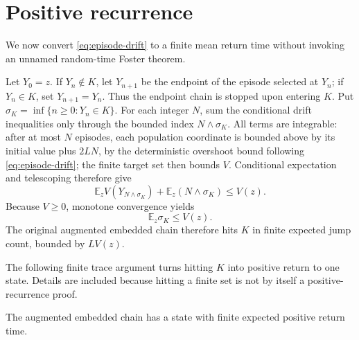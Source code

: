 \section{Positive recurrence}\label{sec:recurrence}

We now convert \eqref{eq:episode-drift} to a finite mean return time without
invoking an unnamed random-time Foster theorem.

Let \(Y_0=z\).  If \(Y_n\notin K\), let \(Y_{n+1}\) be the endpoint of the
episode selected at \(Y_n\); if \(Y_n\in K\), set \(Y_{n+1}=Y_n\).  Thus the
endpoint chain is stopped upon entering \(K\).  Put
\(
 \sigma_K=\inf\{n\ge0:Y_n\in K\}.
\)
For each integer \(N\), sum the conditional drift inequalities only through
the bounded index \(N\wedge\sigma_K\).  All terms are integrable: after at
most \(N\) episodes, each population coordinate is bounded above by its
initial value plus \(2LN\), by the deterministic overshoot bound following
\eqref{eq:episode-drift}; the finite target set then bounds \(V\).  Conditional
expectation and telescoping therefore give
\begin{equation}\label{eq:stopped-drift}
  \mathbb E_zV(Y_{N\wedge\sigma_K})
  +\mathbb E_z(N\wedge\sigma_K)
  \le V(z).
\end{equation}
Because \(V\ge0\), monotone convergence yields
\begin{equation}\label{eq:episodes-to-K}
  \mathbb E_z\sigma_K\le V(z).
\end{equation}
The original augmented embedded chain therefore hits \(K\) in finite
expected jump count, bounded by \(L V(z)\).

The following finite trace argument turns hitting \(K\) into positive return
to one state.  Details are included because hitting a finite set is not by
itself a positive-recurrence proof.

\begin{proposition}\label{prop:trace}
The augmented embedded chain has a state with finite expected positive return
time.
\end{proposition}

